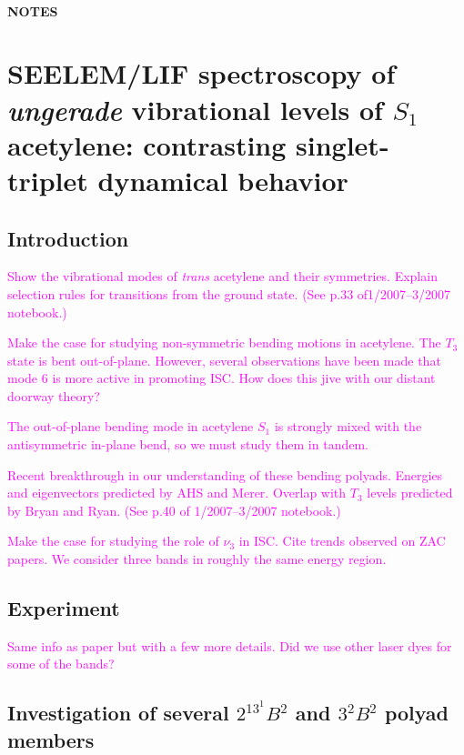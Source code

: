 \documentclass[12pt]{mitthesis}
\newcommand{\POINT}[1]{\textcolor{magenta}{#1}}
\begin{document}
\tableofcontents
\clearpage

\subsubsection*{NOTES}

\clearpage

\chapter{SEELEM/LIF spectroscopy of \emph{ungerade}
  vibrational levels of $S_1$ acetylene: contrasting singlet-triplet
  dynamical behavior}

\section{Introduction}

\POINT{Show the vibrational modes of \emph{trans} acetylene and their
  symmetries.  Explain selection rules for transitions from the ground
  state.  (See p.33 of1/2007--3/2007 notebook.)}

\POINT{Make the case for studying non-symmetric bending motions in
  acetylene.  The $T_3$ state is bent out-of-plane.  However, several
  observations have been made that mode 6 is more active in promoting
  ISC.  How does this jive with our distant doorway theory?}

\POINT{The out-of-plane bending mode in acetylene $S_1$ is strongly
  mixed with the antisymmetric in-plane bend, so we must study them in
  tandem.}

\POINT{Recent breakthrough in our understanding of these bending
  polyads.  Energies and eigenvectors predicted by AHS and Merer.
  Overlap with $T_3$ levels predicted by Bryan and Ryan.  (See p.40 of
  1/2007--3/2007 notebook.)}

\POINT{Make the case for studying the role of $\nu_3$ in ISC.  Cite
  trends observed on ZAC papers.  We consider three bands in roughly
  the same energy region.}

\section{Experiment}

\POINT{Same info as paper but with a few more details.  Did we use
  other laser dyes for some of the bands?}

\section{Investigation of several $2^13^1B^2$ and $3^2B^2$ polyad members}
\end{document}
